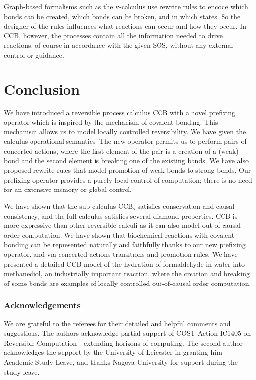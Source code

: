 Graph-based formalisms such as the $\kappa$-calculus \cite{danos2004kappa}
use rewrite rules to encode which bonds 
can be created, which bonds can be broken, and in which states. So the designer of the rules
influences what reactions can occur and how they occur. In CCB, however, the processes contain
all the information needed to drive reactions, of course in accordance with the given
SOS, without any external control or guidance.


\section{Conclusion}
We have introduced a reversible process calculus CCB with a novel prefixing operator which is inspired
by the mechanism of covalent bonding. This mechanism allows us to model locally controlled reversibility.
We have given the calculus operational semantics.
The new operator permits us to perform pairs of concerted actions, where the first element of the pair
is a creation of a (weak) bond and the second element is breaking one of the existing bonds.
We have also proposed rewrite rules that model promotion of weak bonds to strong bonds.
Our prefixing operator provides a purely local control of computation; there is no need
for an extensive memory or global control. 

We have shown that the sub-calculus
$\mathrm{CCB_s}$ satisfies conservation and causal consistency, and the full calculus
satisfies several diamond properties.  CCB is more expressive than other reversible calculi
as it can also model out-of-causal order computation. We have shown that biochemical reactions
with covalent bonding can be represented naturally and faithfully thanks to our new prefixing 
operator, and via concerted actions transitions and promotion rules.
We have presented a detailed CCB model of the
hydration of formaldehyde in water into methanediol, an industrially important
reaction, where the creation and breaking of some bonds are examples of locally
controlled out-of-causal order computation.



\subsubsection*{Acknowledgements}
We are grateful to the referees for their detailed and helpful comments and suggestions.
The authors acknowledge partial support of COST Action IC1405 on Reversible Computation -
extending horizons of computing. The second author acknowledges the support by the University 
of Leicester in granting him Academic Study Leave, and thanks Nagoya University for support 
during the study leave.




